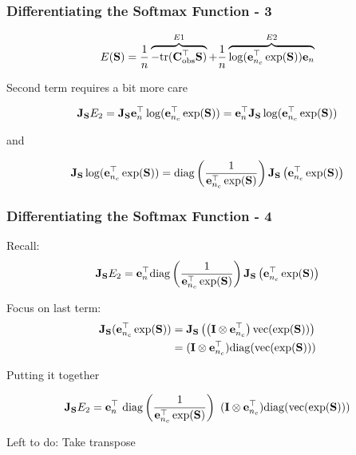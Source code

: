 \documentclass[12pt,fleqn,handout]{beamer}
\begin{document}
\begin{frame}[fragile]\frametitle{Differentiating the Softmax Function - 3}


$$ E({\bf S}) = \frac{1}{n}\overbrace{-{\rm tr}({\bf C}_{\rm obs}^{\top} {\bf S})}^{E1} + \frac{1}{n} \overbrace{\log({\bf e}_{n_c}^\top\exp({\bf S})){\bf e}_n}^{E2}  $$


\bigskip

Second  term requires a bit more care

$$ {\bf J}_{{\bf S}}E_2 = {\bf J}_{{\bf S}} {\bf e}_n^{\top}\log({\bf e}_{n_c}^\top \exp({\bf S})) = 
 {\bf e}_n^{\top}{\bf J}_{{\bf S}}  \log({\bf e}_{n_c}^\top\exp({\bf S}))  $$

\pause 
 and
 
$$ {\bf J}_{{\bf S}}  \log({\bf e}_{n_c}^\top\exp({\bf S})) = {\rm diag}
\left( {\frac {1}{{\bf e}_{n_c}^\top\exp({\bf S})}}\right)
{\bf J}_{{\bf S}}\left({\bf e}_{n_c}^\top\exp({\bf S}) \right) $$
 

\end{frame}


\begin{frame}[fragile]\frametitle{Differentiating the Softmax Function - 4}
	Recall:
$$ {\bf J}_{{\bf S}}  E_2 = {\bf e}_n^\top  {\rm diag}
\left( {\frac {1}{{\bf e}_{n_c}^\top\exp({\bf S})}}\right)
{\bf J}_{{\bf S}}\left({\bf e}_{n_c}^\top\exp({\bf S}) \right) $$

Focus on last term:
\begin{align*}
   {\bf J}_{{\bf S}} ({\bf e}_{n_c}^\top \exp({\bf S})) & = {\bf J}_{{\bf S}} \left(\left({\bf I} \otimes {\bf e}_{n_c}^{\top} \right)  {\rm vec}(\exp({\bf S}))\right)\\
   &  = ({\bf I} \otimes {\bf e}_{n_c}^{\top})  {\rm diag}( {\rm vec}(\exp({\bf S})))
\end{align*}
 
 \pause
 Putting it together
 
 
 $$ {\bf J}_{{\bf S}}E_2 =  {\bf e}_n^{\top}\ {\rm diag}
\left( {\frac {1}{{\bf e}_{n_c}^\top \exp({\bf S})}}\right) \  ( {\bf I} \otimes {\bf e}_{n_c}^{\top})  {\rm diag}( {\rm vec}(\exp({\bf S}))) $$


\pause

\begin{center}
	Left to do: Take transpose
\end{center}


\end{frame}
\end{document}

